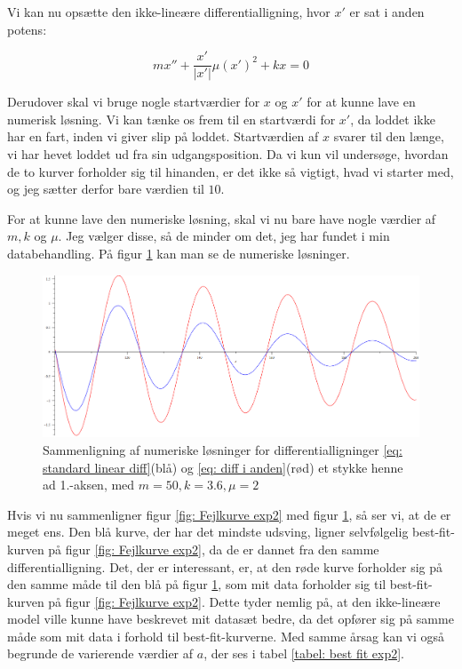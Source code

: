 Vi kan nu opsætte den ikke-lineære differentialligning, hvor $x'$ er sat i anden potens:

\begin{equation}
mx'' + \frac{x'}{|x'|} \mu  (x')^2 + kx = 0
\label{eq: diff i anden}
\end{equation}

Derudover skal vi bruge nogle startværdier for $x$ og $x'$ for at kunne lave en numerisk løsning.
Vi kan tænke os frem til en startværdi for $x'$, da loddet ikke har en fart, inden vi giver slip på loddet. 
Startværdien af $x$ svarer til den længe, vi har hevet loddet ud fra sin udgangsposition. 
Da vi kun vil undersøge, hvordan de to kurver forholder sig til hinanden, er det ikke så vigtigt, hvad vi starter med, og jeg sætter derfor bare værdien til $10$.

For at kunne lave den numeriske løsning, skal vi nu bare have nogle værdier af $m,k$ og $\mu$. 
Jeg vælger disse, så de minder om det, jeg har fundet i min databehandling. 
På figur \ref{fig: numeriske solutions} kan man se de numeriske løsninger. 

\begin{figure}[h]
\centering
\includegraphics[scale=0.45]{Figurer/diffligninger}
\caption{Sammenligning af numeriske løsninger for differentialligninger \ref{eq: standard linear diff}(blå) og \ref{eq: diff i anden}(rød) et stykke henne ad 1.-aksen, med $m=50,k=3.6,\mu=2$}
\label{fig: numeriske solutions}

\end{figure}

Hvis vi nu sammenligner figur \ref{fig: Fejlkurve exp2} med figur \ref{fig: numeriske solutions}, så ser vi, at de er meget ens. 
Den blå kurve, der har det mindste udsving, ligner selvfølgelig best-fit-kurven på figur \ref{fig: Fejlkurve exp2}, da de er dannet fra den samme differentialligning. 
Det, der er interessant, er, at den røde kurve forholder sig på den samme måde til den blå på figur \ref{fig: numeriske solutions}, som mit data forholder sig til best-fit-kurven på figur \ref{fig: Fejlkurve exp2}. 
Dette tyder nemlig på, at den ikke-lineære model ville kunne have beskrevet mit datasæt bedre, da det opfører sig på samme måde som mit data i forhold til best-fit-kurverne. 
Med samme årsag kan vi også begrunde de varierende værdier af $a$, der ses i tabel \ref{tabel: best fit exp2}.





